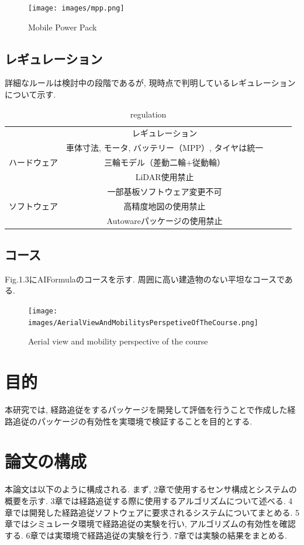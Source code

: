 \begin{figure}[H]
  \centering
 \texttt{[image: images/mpp.png]}
 \caption{Mobile Power Pack}
 \label{fig:MPP}
\end{figure}

\subsection{レギュレーション}
詳細なルールは検討中の段階であるが, 現時点で判明しているレギュレーションについて示す.

\begin{table}[H]
     \centering
     \caption{regulation}
     \begin{tabular}{|c|c|lll}
     \cline{1-2}
                              & レギュレーション              &  &  &  \\ \cline{1-2}
                                   & 車体寸法, モータ, バッテリー（MPP）, タイヤは統一 &  &  &  \\
     ハードウェア                       & 三輪モデル（差動二輪+従動輪）               &  &  &  \\
                                   & LiDAR使用禁止                     &  &  &  \\
                                   & 一部基板ソフトウェア変更不可                &  &  &  \\ \cline{1-2}
     \multicolumn{1}{|l|}{ソフトウェア} & 高精度地図の使用禁止                    &  &  &  \\
     \multicolumn{1}{|l|}{}       & Autowareパッケージの使用禁止            &  &  &  \\ \cline{1-2}
     \end{tabular}
\end{table}

\subsection{コース}
Fig.1.3にAIFormulaのコースを示す.
周囲に高い建造物のない平坦なコースである.


\begin{figure}[H]
  \centering
 \texttt{[image: images/AerialViewAndMobilitysPerspetiveOfTheCourse.png]}
 \caption{Aerial view and mobility perspective of the course}
 \label{fig:course}
\end{figure}


\section{目的}
本研究では, 経路追従をするパッケージを開発して評価を行うことで作成した経路追従のパッケージの有効性を実環境で検証することを目的とする.


\section{論文の構成}
本論文は以下のように構成される.
まず, 2章で使用するセンサ構成とシステムの概要を示す.
3章では経路追従する際に使用するアルゴリズムについて述べる.
4章では開発した経路追従ソフトウェアに要求されるシステムについてまとめる.
5章ではシミュレータ環境で経路追従の実験を行い, アルゴリズムの有効性を確認する.
6章では実環境で経路追従の実験を行う.
7章では実験の結果をまとめる.

\newpage
